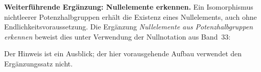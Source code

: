 \documentclass[main.tex]{subfiles}
\begin{document}
\noindent\textbf{Weiterführende Ergänzung: Nullelemente erkennen.}
Ein Isomorphismus nichtleerer Potenzhalbgruppen erhält die Existenz
eines Nullelements, auch ohne Endlichkeitsvoraussetzung.
Die Ergänzung \emph{Nullelemente aus Potenzhalbgruppen erkennen}
beweist dies unter Verwendung der Nullnotation aus Band~33:
\par\smallskip
Der Hinweis ist ein Ausblick; der hier vorausgehende Aufbau verwendet
den Ergänzungssatz nicht.

\ProofWideReasonsAtRight
\end{document}
